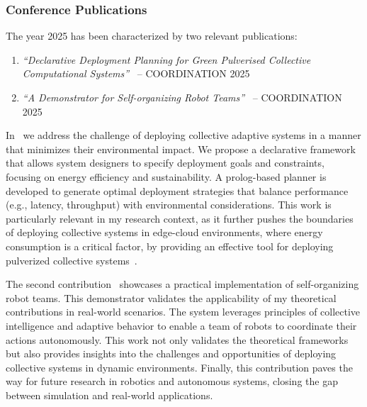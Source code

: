 \documentclass[runningheads]{llncs}
\begin{document}
\subsubsection{Conference Publications}

The year 2025 has been characterized by two relevant publications:

\begin{enumerate}
\item \textit{``Declarative Deployment Planning for Green Pulverised Collective Computational Systems''}~\cite{DBLP:conf/coordination/BrogiCFFV25} -- COORDINATION 2025 %
\item \textit{``A Demonstrator for Self-organizing Robot Teams''}~\cite{DBLP:conf/coordination/AguzziBBCCDFPV25} -- COORDINATION 2025 %
\end{enumerate}

In~\cite{DBLP:conf/coordination/BrogiCFFV25} we address the challenge of deploying collective adaptive systems in a manner that minimizes their environmental impact.
%
We propose a declarative framework that allows system designers to specify deployment goals and constraints, focusing on energy efficiency and sustainability.
%
A prolog-based planner is developed to generate optimal deployment strategies that balance performance (e.g., latency, throughput) with environmental considerations.
%
This work is particularly relevant in my research context,
as it further pushes the boundaries of deploying collective systems in edge-cloud environments,
where energy consumption is a critical factor,
by providing an effective tool for deploying pulverized collective systems~\cite{DBLP:journals/fgcs/FarabegoliPCV24,DBLP:journals/iot/FarabegoliPCV24,DBLP:conf/acsos/FarabegoliVC24}.

The second contribution~\cite{DBLP:conf/coordination/AguzziBBCCDFPV25} showcases a practical implementation of self-organizing robot teams.
%
This demonstrator validates the applicability of my theoretical contributions in real-world scenarios.
%
The system leverages principles of collective intelligence and adaptive behavior to enable a team of robots to coordinate their actions autonomously.
%
This work not only validates the theoretical frameworks but also provides insights into the challenges and opportunities of deploying collective systems in dynamic environments.
%
Finally,
this contribution paves the way for future research in robotics and autonomous systems,
closing the gap between simulation and real-world applications.
\end{document}
